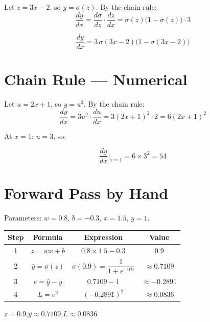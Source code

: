 \documentclass[11pt, a4paper]{article}
\begin{document}
\begin{tcolorbox}[solutionbox]
Let $z = 3x - 2$, so $y = \sigma(z)$. By the chain rule:
$$\frac{dy}{dx} = \frac{d\sigma}{dz} \cdot \frac{dz}{dx} = \sigma(z)\bigl(1 - \sigma(z)\bigr) \cdot 3$$

\begin{tcolorbox}[answerbox]
$$\frac{dy}{dx} = 3\,\sigma(3x-2)\bigl(1 - \sigma(3x-2)\bigr)$$
\end{tcolorbox}
\end{tcolorbox}

\section{Chain Rule — Numerical}

\begin{tcolorbox}[solutionbox]
Let $u = 2x + 1$, so $y = u^3$. By the chain rule:
$$\frac{dy}{dx} = 3u^2 \cdot \frac{du}{dx} = 3(2x+1)^2 \cdot 2 = 6(2x+1)^2$$

At $x = 1$: $u = 3$, so:

\begin{tcolorbox}[answerbox]
$$\frac{dy}{dx}\bigg|_{x=1} = 6 \times 3^2 = 54$$
\end{tcolorbox}
\end{tcolorbox}

\section{Forward Pass by Hand}
\label{sec:forward-pass-by-hand}

\begin{tcolorbox}[solutionbox]
Parameters: $w = 0.8$, $b = -0.3$, $x = 1.5$, $y = 1$.

\begin{center}
\begin{tabular}{cccc}
\toprule
Step & Formula & Expression & Value \\
\midrule
1 & $z = wx + b$ & $0.8 \times 1.5 - 0.3$ & $0.9$ \\[0.8em]
2 & $\hat{y} = \sigma(z)$ & $\sigma(0.9) = \dfrac{1}{1+e^{-0.9}}$ & $\approx 0.7109$ \\[1em]
3 & $e = \hat{y} - y$ & $0.7109 - 1$ & $\approx -0.2891$ \\[0.8em]
4 & $L = e^2$ & $(-0.2891)^2$ & $\approx 0.0836$ \\[0.8em]
\bottomrule
\end{tabular}
\end{center}

\begin{tcolorbox}[answerbox]
$z = 0.9$,\quad $\hat{y} \approx 0.7109$,\quad $L \approx 0.0836$
\end{tcolorbox}
\end{tcolorbox}
\end{document}
